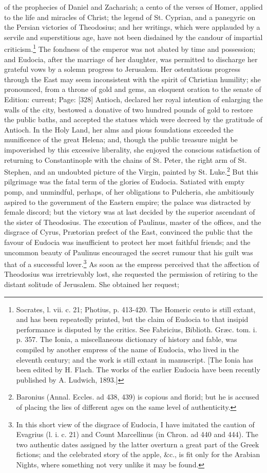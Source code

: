 of the prophecies of Daniel and Zachariah; a cento of the verses of Homer, applied to the life and miracles of Christ; the legend of St. Cyprian, and a panegyric on the Persian victories of Theodosius; and her writings, which were applauded by a servile and superstitious age, have not been disdained by the candour of impartial criticism.\footnote{Socrates, l. vii. c. 21; Photius, p. 413-420. The Homeric cento is still extant, and has been repeatedly printed, but the claim of Eudocia to that insipid performance is disputed by the critics. See Fabricius, Biblioth. Græc. tom. i. p. 357. The Ionia, a miscellaneous dictionary of history and fable, was compiled by another empress of the name of Eudocia, who lived in the eleventh century; and the work is still extant in manuscript. [The Ionia has been edited by H. Flach. The works of the earlier Eudocia have been recently published by A. Ludwich, 1893.]} The fondness of the emperor was not abated by time and possession; and Eudocia, after the marriage of her daughter, was permitted to discharge her grateful vows by a solemn progress to Jerusalem. Her ostentatious progress through the East may seem inconsistent with the spirit of Christian humility; she pronounced, from a throne of gold and gems, an eloquent oration to the senate of Edition: current; Page: [328] Antioch, declared her royal intention of enlarging the walls of the city, bestowed a donative of two hundred pounds of gold to restore the public baths, and accepted the statues which were decreed by the gratitude of Antioch. In the Holy Land, her alms and pious foundations exceeded the munificence of the great Helena; and, though the public treasure might be impoverished by this excessive liberality, she enjoyed the conscious satisfaction of returning to Constantinople with the chains of St. Peter, the right arm of St. Stephen, and an undoubted picture of the Virgin, painted by St. Luke.\footnote{Baronius (Annal. Eccles. ad 438, 439) is copious and florid; but he is accused of placing the lies of different ages on the same level of authenticity.} But this pilgrimage was the fatal term of the glories of Eudocia. Satiated with empty pomp, and unmindful, perhaps, of her obligations to Pulcheria, she ambitiously aspired to the government of the Eastern empire; the palace was distracted by female discord; but the victory was at last decided by the superior ascendant of the sister of Theodosius. The execution of Paulinus, master of the offices, and the disgrace of Cyrus, Prætorian prefect of the East, convinced the public that the favour of Eudocia was insufficient to protect her most faithful friends; and the uncommon beauty of Paulinus encouraged the secret rumour that his guilt was that of a successful lover.\footnote{In this short view of the disgrace of Eudocia, I have imitated the caution of Evagrius (l. i. c. 21) and Count Marcellinus (in Chron. ad 440 and 444). The two authentic dates assigned by the latter overturn a great part of the Greek fictions; and the celebrated story of the apple, \&c., is fit only for the Arabian Nights, where something not very unlike it may be found.} As soon as the empress perceived that the affection of Theodosius was irretrievably lost, she requested the permission of retiring to the distant solitude of Jerusalem. She obtained her request; 